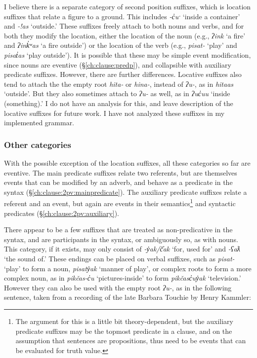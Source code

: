 I believe there is a separate category of second position suffixes, which is location suffixes that relate a figure to a ground. This includes \textit{-c̓uˑ} `inside a container' and \textit{-!as} `outside.' These suffixes freely attach to both nouns and verbs, and for both they modify the location, either the location of the noun (e.g., \textit{ʔink} `a fire' and \textit{ʔink̓ʷas} `a fire outside') or the location of the verb (e.g., \textit{pisat-} `play' and \textit{pisat̓as} `play outside'). It is possible that these may be simple event modification, since nouns are eventive (\S\ref{ch:clause:predp}), and collapsible with auxiliary predicate suffixes. However, there are further differences. Locative suffixes also tend to attach the the empty root \textit{hita-} or \textit{hina-}, instead of \textit{ʔu-}, as in \textit{hitaas} `outside'. But they also sometimes attach to \textit{ʔu-} as well, as in \textit{ʔuc̓uu} `inside (something).' I do not have an analysis for this, and leave description of the locative suffixes for future work. I have not analyzed these suffixes in my implemented grammar.

\subsubsection{Other categories} \label{ch:clause:2pv:additional}

With the possible exception of the location suffixes, all these categories so far are eventive. The main predicate suffixes relate two referents, but are themselves events that can be modified by an adverb, and behave as a predicate in the syntax (\S\ref{ch:clause:2pv:mainpredicate}). The auxiliary predicate suffixes relate a referent and an event, but again are events in their semantics\footnote{The argument for this is a little bit theory-dependent, but the auxiliary predicate suffixes may be the topmost predicate in a clause, and on the assumption that sentences are propositions, thus need to be events that can be evaluated for truth value.} and syntactic predicates (\S\ref{ch:clause:2pv:auxiliary}).

There appear to be a few suffixes that are treated as non-predicative in the syntax, and are participants in the syntax, or ambiguously so, as with nouns. This category, if it exists, may only consist of \textit{-y̓ak/č̓ak} `for, used for' and \textit{-ʕaƛ} `the sound of.' These endings can be placed on verbal suffixes, such as \textit{pisat-} `play' to form a noun, \textit{pisaty̓ak} `manner of play', or complex roots to form a more complex noun, as in \textit{pikčas-c̓u} `pictures-inside' to form \textit{pikčasc̓uy̓ak} `television.' However they can also be used with the empty root \textit{ʔu-}, as in the following sentence, taken from a recording of the late Barbara Touchie by Henry Kammler:


